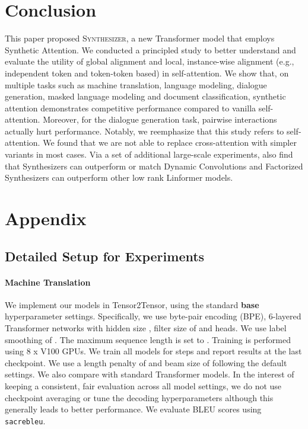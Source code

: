 \documentclass{article} \usepackage{iclr2021_conference,times}
\begin{document}
\section{Conclusion}
This paper proposed \textsc{Synthesizer}, a new Transformer model that employs Synthetic Attention. We conducted a principled study to better understand and evaluate the utility of global alignment and local, instance-wise alignment (e.g., independent token and token-token based) in self-attention. We show that, on multiple tasks such as machine translation, language modeling, dialogue generation, masked language modeling and document classification, synthetic attention demonstrates competitive performance compared to vanilla self-attention. Moreover, for the dialogue generation task, pairwise interactions actually hurt performance. Notably, we reemphasize that this study refers to self-attention. We found that we are not able to replace cross-attention with simpler variants in most cases. Via a set of additional large-scale experiments, also find that Synthesizers can outperform or match Dynamic Convolutions and Factorized Synthesizers can outperform other low rank Linformer models.











\appendix
\section{Appendix}





\subsection{Detailed Setup for Experiments}

\paragraph{Machine Translation} We implement our models in Tensor2Tensor, using the standard \textbf{base} hyperparameter settings. Specifically, we use byte-pair encoding (BPE), 6-layered Transformer networks with hidden size , filter size of  and  heads. We use label smoothing of . The maximum sequence length is set to . Training is performed using 8 x V100 GPUs. We train all models for  steps and report results at the last checkpoint. We use a length penalty of  and beam size of  following the default settings. We also compare with standard Transformer models. In the interest of keeping a consistent, fair evaluation across all model settings, we do not use checkpoint averaging or tune the decoding hyperparameters although this generally leads to better performance. We evaluate BLEU scores using \texttt{sacrebleu}.
\end{document}
